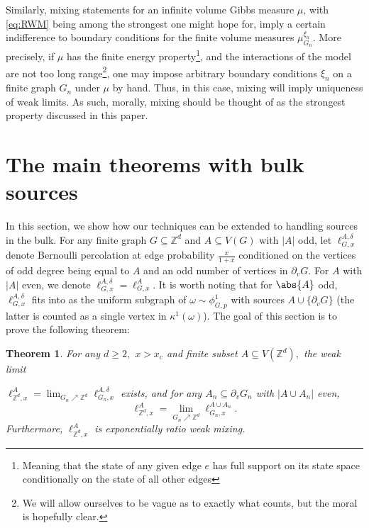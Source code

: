 \documentclass[article,11pt,reqno]{amsart}
\newcommand{\Z}{\mathbb{Z}}
\newtheorem{theorem}{Theorem}[section]
\begin{document}
Similarly, mixing statements for an infinite volume Gibbs measure $\mu$, with \eqref{eq:RWM} being among the strongest one might hope for, imply a certain indifference to boundary conditions for the finite volume measures $\mu^{\xi_n}_{G_n}.$ More precisely, if $\mu$ has the finite energy property\footnote{Meaning that the state of any given edge $e$ has full support on its state space conditionally on the state of all other edges}, and the interactions of the model are not too long range\footnote{We will allow ourselves to be vague as to exactly what counts, but the moral is hopefully clear.}, one may impose arbitrary boundary conditions $\xi_n$ on a finite graph $G_n$ under $\mu$ by hand. Thus, in this case, mixing will imply uniqueness of weak limits. As such, morally, mixing should be thought of as the strongest property discussed in this paper.





\section{The main theorems with bulk sources} \label{sec:how_to_handle_sources}




In this section, we show how our techniques can be extended to handling sources in the bulk. For any finite graph $G \subseteq \Z^d$ and $A \subseteq V(G)$ with $|A|$ odd,  let $\ell^{A,\delta}_{G,x}$ denote Bernoulli percolation at edge probability $\frac{x}{1+x}$ conditioned on the vertices of odd degree being equal to $A$ and an odd number of vertices in $\partial_v G$. For $A$ with $|A|$ even, we denote $\ell^{A,\delta}_{G,x}=\ell_{G,x}^A$. It is worth noting that for $\abs{A}$ odd, $\ell^{A,\delta}_{G,x}$ fits into  as the uniform subgraph of $\omega\sim \phi^1_{G,p}$ with sources $A\cup \{\partial_v G\}$ (the latter is counted as a single vertex in $\kappa^1(\omega)$). The goal of this section is to prove the following theorem:
\begin{theorem} \label{thm:Unique_loop_with_sources}
For any $d\geq 2,$ $x>x_c$ and finite subset $A\subseteq V(\mathbb{Z}^d),$ the weak limit 

\noindent $\ell^A_{\mathbb{Z}^d,x}=\lim_{G_n\nearrow \mathbb{Z}^d} \ell_{G_n,x}^{A,\delta}$ exists, and for any $A_n\subseteq \partial _vG_n$ with $|A\cup A_n|$ even, 
$$
\ell^A_{\mathbb{Z}^d,x}=\lim_{G_n\nearrow \mathbb{Z}^d}\ell^{A\cup A_n}_{G_n,x}.
$$
Furthermore, $\ell^A_{\mathbb{Z}^d,x}$ is exponentially ratio weak mixing.
\end{theorem}
\end{document}
